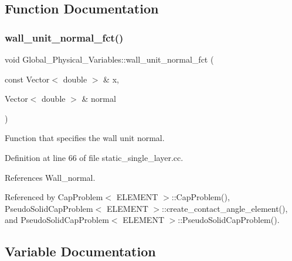 \subsection{Function Documentation}
\mbox{\label{namespaceGlobal__Physical__Variables_a0d48e8726fa485de2b2df2d5031ec41b}} 
\subsubsection{\texorpdfstring{wall\+\_\+unit\+\_\+normal\+\_\+fct()}{wall\_unit\_normal\_fct()}}
{\footnotesize\ttfamily void Global\+\_\+\+Physical\+\_\+\+Variables\+::wall\+\_\+unit\+\_\+normal\+\_\+fct (\begin{DoxyParamCaption}\item[{const Vector$<$ double $>$ \&}]{x,  }\item[{Vector$<$ double $>$ \&}]{normal }\end{DoxyParamCaption})}



Function that specifies the wall unit normal. 



Definition at line 66 of file static\+\_\+single\+\_\+layer.\+cc.



References Wall\+\_\+normal.



Referenced by Cap\+Problem$<$ E\+L\+E\+M\+E\+N\+T $>$\+::\+Cap\+Problem(), Pseudo\+Solid\+Cap\+Problem$<$ E\+L\+E\+M\+E\+N\+T $>$\+::create\+\_\+contact\+\_\+angle\+\_\+element(), and Pseudo\+Solid\+Cap\+Problem$<$ E\+L\+E\+M\+E\+N\+T $>$\+::\+Pseudo\+Solid\+Cap\+Problem().



\subsection{Variable Documentation}
\mbox{\label{namespaceGlobal__Physical__Variables_a3962c36313826b19f216f6bbbdd6a477}} 
